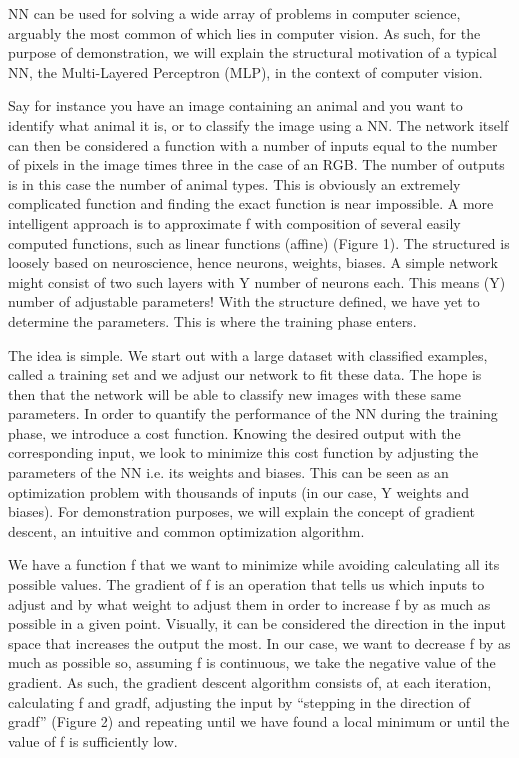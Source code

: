 \startsection[title=Classical Neural Networks ({\small Multilayer Perceptron})]
NN can be used for solving a wide array of problems in computer science, arguably the most common of which lies in computer vision.
 As such, for the purpose of demonstration, we will explain the structural motivation of a typical NN, the Multi-Layered Perceptron (MLP), in the context of computer vision.  

Say for instance you have an image containing an animal and you want to identify what animal it is, or to classify the image using a NN.
The network itself can then be considered a function with a number of inputs equal to the number of pixels in the image times three in the case of an RGB.
The number of outputs is in this case the number of animal types.
This is obviously an extremely complicated function and finding the exact function is near impossible.
A more intelligent approach is to approximate f with composition of several easily computed functions, such as linear functions (affine) (Figure 1).
The structured is loosely based on neuroscience, hence neurons, weights, biases.
A simple network might consist of two such layers with Y number of neurons each.
This means (Y) number of adjustable parameters! With the structure defined, we have yet to determine the parameters.
This is where the training phase enters.  

\startsubsection[title=Training phase]
The idea is simple. We start out with a large dataset with classified examples, called a training set and we adjust our network to fit these data.
The hope is then that the network will be able to classify new images with these same parameters.
In order to quantify the performance of the NN during the training phase, we introduce a cost function.
Knowing the desired output with the corresponding input, we look to minimize this cost function by adjusting the parameters of the NN i.e. its weights and biases.
This can be seen as an optimization problem with thousands of inputs (in our case, Y weights and biases).
For demonstration purposes, we will explain the concept of gradient descent, an intuitive and common optimization algorithm.  
\stopsubsection

\startsubsection[title=Optimization using gradient descent]
We have a function f that we want to minimize while avoiding calculating all its possible values.
The gradient of f is an operation that tells us which inputs to adjust and by what weight to adjust them in order to increase f by as much as possible in a given point.
Visually, it can be considered the direction in the input space that increases the output the most.
In our case, we want to decrease f by as much as possible so, assuming f is continuous, we take the negative value of the gradient.
As such, the gradient descent algorithm consists of, at each iteration, calculating f and gradf, adjusting the input by “stepping in the direction of gradf” (Figure 2) and repeating until we have found a local minimum or until the value of f is sufficiently low.  

